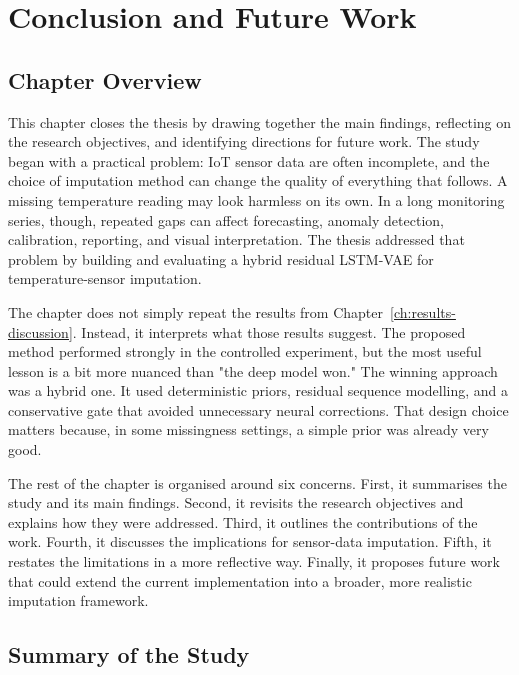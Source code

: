 
\chapter{Conclusion and Future Work}
\label{ch:conclusion-future-work}

\section{Chapter Overview}

This chapter closes the thesis by drawing together the main findings, reflecting on the research objectives, and identifying directions for future work. The study began with a practical problem: IoT sensor data are often incomplete, and the choice of imputation method can change the quality of everything that follows. A missing temperature reading may look harmless on its own. In a long monitoring series, though, repeated gaps can affect forecasting, anomaly detection, calibration, reporting, and visual interpretation. The thesis addressed that problem by building and evaluating a hybrid residual LSTM-VAE for temperature-sensor imputation.

The chapter does not simply repeat the results from Chapter~\ref{ch:results-discussion}. Instead, it interprets what those results suggest. The proposed method performed strongly in the controlled experiment, but the most useful lesson is a bit more nuanced than "the deep model won." The winning approach was a hybrid one. It used deterministic priors, residual sequence modelling, and a conservative gate that avoided unnecessary neural corrections. That design choice matters because, in some missingness settings, a simple prior was already very good.

The rest of the chapter is organised around six concerns. First, it summarises the study and its main findings. Second, it revisits the research objectives and explains how they were addressed. Third, it outlines the contributions of the work. Fourth, it discusses the implications for sensor-data imputation. Fifth, it restates the limitations in a more reflective way. Finally, it proposes future work that could extend the current implementation into a broader, more realistic imputation framework.

\section{Summary of the Study}

